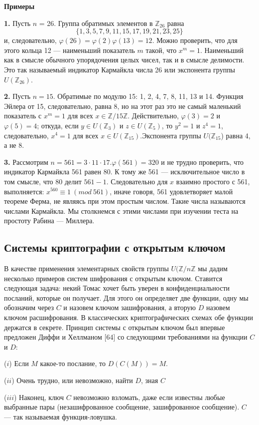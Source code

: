 \textbf{Примеры} \par
 \textbf{1.} Пусть $n$ = 26. Группа обратимых элементов в $\mathbb{Z}_{26}$ равна
$$\{1,3,5,7,9,11,15,17,19,21,23,25\}$$
и, следовательно, $\varphi (26) = \varphi (2) \varphi (13) = 12$. Можно проверить, что для этого кольца 12 --- наименьший показатель $m$ такой, что $x^{m} = 1$. Наименьший как в смысле обычного упорядочения целых чисел, так и в
смысле делимости. Это так называемый индикатор Кармайкла числа 26 или экспонента группы $U(\mathbb{Z}_{26})$. \par
  \textbf{2.} Пусть $n = 15$. Обратимые по модулю 15: 1, 2, 4, 7, 8, 11, 13
и 14. Функция Эйлера от 15, следовательно, равна 8, но на этот раз
это не самый маленький показатель с $x^{m} = 1$ для всех $x \in \mathbb{Z}/15\mathbb{Z}$. Действительно, $\varphi(3) = 2$ и $\varphi(5) = 4$; откуда, если $y \in U(\mathbb{Z}_{3})$ и $z \in U(\mathbb{Z}_5)$, то $y^{2} = 1$ и $z^4 = 1$, следовательно, $x^4 = 1$ для всех $x \in U(\mathbb{Z}_{15})$.Экспонента группы $U(\mathbb{Z}_{15}$) равна 4, а не 8. \par
  \textbf{3.} Рассмотрим $n = 561 = 3 \cdot 11 \cdot 17$.$\varphi (561) = 320$ и не трудно проверить, что индикатор Кармайкла 561 равен 80. К тому же 561 --- исключительное число в том смысле, что 80 делит $561 - 1$. Следовательно
для $x$ взаимно простого с 561, выполняется: $x^{560} \equiv 1\ (mod\ 561)$, 
иначе говоря, 561 удовлетворяет малой теореме Ферма, не являясь при этом простым числом. Такие числа называются числами Кармайкла. Мы столкнемся с этими числами при изучении теста на простоту Рабина — Миллера. \\
\subsection{Системы криптографии с открытым ключом}
В качестве применения элементарных свойств группы $U(\mathbb{Z}/n\mathbb{Z}$ мы дадим несколько примеров систем шифрования с открытым ключом. 
Ставится следующая задача: некий Томас хочет быть уверен в 
конфиденциальности посланий, которые он получает. Для этого он определяет
две функции, одну мы обозначим через $C$ и назовем ключом 
зашифрования, а вторую $D$ назовем ключом расшифрования. В классических
криптографических схемах обе функции держатся в секрете. Принцип
системы с открытым ключом был впервые предложен Диффи и Хеллманом [64] со следующими требованиями на функции $C$ и $D$:\par
  ($i$) Если $M$ какое-то послание, то $D(C(M)) = M$.\par
  ($ii$) Очень трудно, или невозможно, найти $D$, зная $C$\par
  ($iii$) Наконец, ключ $C$ невозможно взломать, даже если известны
любые выбранные пары (незашифрованное сообщение, зашифрованное
сообщение). $C$ --- так называемая функция-ловушка.
\pagebreak
\newpage

